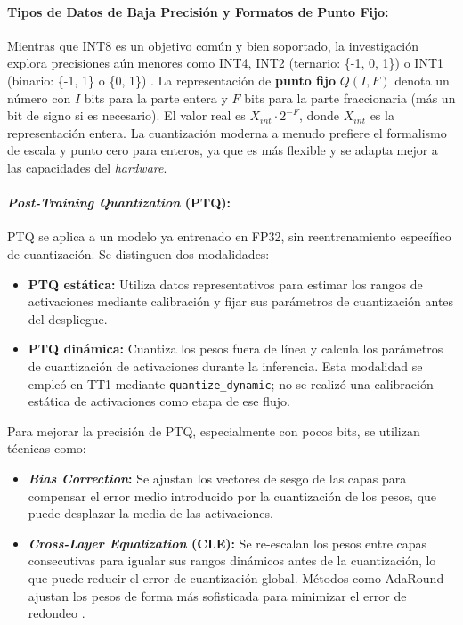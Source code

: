 \documentclass[12pt]{article}
\begin{document}
\paragraph{Tipos de Datos de Baja Precisión y Formatos de Punto Fijo:}
Mientras que INT8 es un objetivo común y bien soportado, la investigación explora precisiones aún menores como INT4, INT2 (ternario: \{-1, 0, 1\}) o INT1 (binario: \{-1, 1\} o \{0, 1\}) \cite{LiX2021RobustnessAware}. La representación de \textbf{punto fijo} $Q(I,F)$ denota un número con $I$ bits para la parte entera y $F$ bits para la parte fraccionaria (más un bit de signo si es necesario). El valor real es $X_{int} \cdot 2^{-F}$, donde $X_{int}$ es la representación entera. La cuantización moderna a menudo prefiere el formalismo de escala y punto cero para enteros, ya que es más flexible y se adapta mejor a las capacidades del \textit{hardware}.

\paragraph{\textit{Post-Training Quantization} (PTQ):}
PTQ se aplica a un modelo ya entrenado en FP32, sin reentrenamiento específico de cuantización. Se distinguen dos modalidades:
\begin{itemize}
    \item \textbf{PTQ estática:} Utiliza datos representativos para estimar los rangos de activaciones mediante calibración y fijar sus parámetros de cuantización antes del despliegue.
    \item \textbf{PTQ dinámica:} Cuantiza los pesos fuera de línea y calcula los parámetros de cuantización de activaciones durante la inferencia. Esta modalidad se empleó en TT1 mediante \texttt{quantize\_dynamic}; no se realizó una calibración estática de activaciones como etapa de ese flujo.
\end{itemize}
Para mejorar la precisión de PTQ, especialmente con pocos bits, se utilizan técnicas como:
\begin{itemize}
    \item \textbf{\textit{Bias Correction}:} Se ajustan los vectores de sesgo de las capas para compensar el error medio introducido por la cuantización de los pesos, que puede desplazar la media de las activaciones.
    \item \textbf{\textit{Cross-Layer Equalization} (CLE):} Se re-escalan los pesos entre capas consecutivas para igualar sus rangos dinámicos antes de la cuantización, lo que puede reducir el error de cuantización global. Métodos como AdaRound ajustan los pesos de forma más sofisticada para minimizar el error de redondeo \cite{Liang2021PruningSurvey, Rezk2022MOHAQ}.
\end{itemize}
\end{document}
